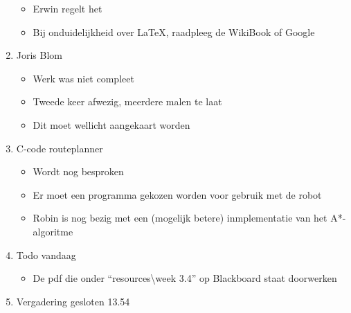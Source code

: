 \documentclass{report}
\begin{document}
\begin{enumerate}
\begin{itemize}
		\item Erwin regelt het
		\item Bij onduidelijkheid over LaTeX, raadpleeg de WikiBook of Google
	\end{itemize}
	\item Joris Blom
	\begin{itemize}
		\item Werk was niet compleet
		\item Tweede keer afwezig, meerdere malen te laat
		\item Dit moet wellicht aangekaart worden
	\end{itemize}
	\item C-code routeplanner
	\begin{itemize}
		\item Wordt nog besproken
		\item Er moet een programma gekozen worden voor gebruik met de robot
		\item Robin is nog bezig met een (mogelijk betere) inmplementatie van het A*-algoritme
	\end{itemize}
	\item Todo vandaag
	\begin{itemize}
		\item De pdf die onder ``resources\textbackslash week 3.4'' op Blackboard staat doorwerken
	\end{itemize}
	\item Vergadering gesloten 13.54

\end{enumerate}
\end{document}
